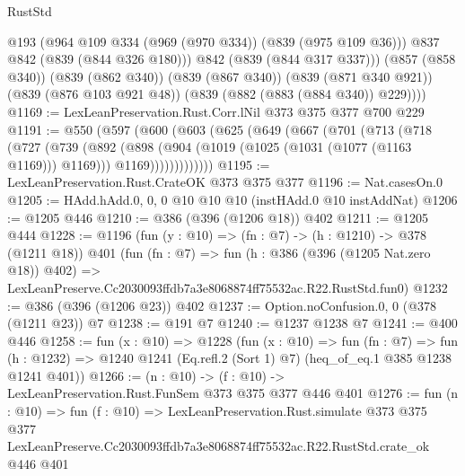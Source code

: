 \begin{lexlean}{RustStd}
\begin{coremodule}
            @193
            (@964 @109 @334 (@969 (@970 @334)) (@839 (@975 @109 @36)))
            @837
            @842
            (@839 (@844 @326 @180)))
          @842
          (@839 (@844 @317 @337)))
        (@857 (@858 @340))
        (@839 (@862 @340))
        (@839 (@867 @340))
        (@839 (@871 @340 @921))
        (@839 (@876 @103 @921 @48))
        (@839 (@882 (@883 (@884 @340)) @229))))
@1169 := LexLeanPreservation.Rust.Corr.lNil @373 @375 @377 @700 @229
@1191 := @550
    (@597
      (@600
        (@603
          (@625
            (@649
              (@667
                (@701
                  (@713
                    (@718
                      (@727
                        (@739
                          (@892
                            (@898
                              (@904 (@1019 (@1025 (@1031 (@1077 (@1163 @1169))) @1169)))
                              @1169)))))))))))))
@1195 := LexLeanPreservation.Rust.CrateOK @373 @375 @377
@1196 := Nat.casesOn.{0}
@1205 := HAdd.hAdd.{0, 0, 0} @10 @10 @10 (instHAdd.{0} @10 instAddNat)
@1206 := @1205 @446
@1210 := @386 (@396 (@1206 @18)) @402
@1211 := @1205 @444
@1228 := @1196
    (fun (y : @10) => (fn : @7) -> (h : @1210) -> @378 (@1211 @18))
    @401
    (fun (fn : @7) =>
    fun (h : @386 (@396 (@1205 Nat.zero @18)) @402) =>
    LexLeanPreserve.Cc2030093ffdb7a3e8068874ff75532ac.R22.RustStd.fun0)
@1232 := @386 (@396 (@1206 @23)) @402
@1237 := Option.noConfusion.{0, 0} (@378 (@1211 @23)) @7
@1238 := @191 @7
@1240 := @1237 @1238 @7
@1241 := @400 @446
@1258 := fun (x : @10) =>
  @1228
    (fun (x : @10) =>
    fun (fn : @7) =>
    fun (h : @1232) => @1240 @1241 (Eq.refl.{2} (Sort 1) @7) (heq_of_eq.{1} @385 @1238 @1241 @401))
@1266 := (n : @10) -> (f : @10) -> LexLeanPreservation.Rust.FunSem @373 @375 @377 @446 @401
@1276 := fun (n : @10) =>
  fun (f : @10) =>
  LexLeanPreservation.Rust.simulate
    @373
    @375
    @377
    LexLeanPreserve.Cc2030093ffdb7a3e8068874ff75532ac.R22.RustStd.crate_ok
    @446
    @401
\end{coremodule}
\end{lexlean}
